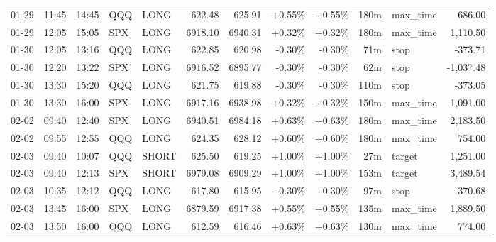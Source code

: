 \documentclass[11pt,a4paper,twoside]{article}
\begin{document}
\begin{center}
\begin{longtable}{>{\color{txtmain}}l l l l l r r r r r >{\color{txtmain}}l r}
01-29 & 11:45 & 14:45 & QQQ & LONG & 622.48 & 625.91 & \textcolor{wingreen}{+0.55\%} & \textcolor{wingreen}{+0.55\%} & 180m & max\_time & \textcolor{wingreen}{686.00} \\
01-29 & 12:05 & 15:05 & SPX & LONG & 6918.10 & 6940.31 & \textcolor{wingreen}{+0.32\%} & \textcolor{wingreen}{+0.32\%} & 180m & max\_time & \textcolor{wingreen}{1,110.50} \\
01-30 & 12:05 & 13:16 & QQQ & LONG & 622.85 & 620.98 & \textcolor{lossred}{-0.30\%} & \textcolor{lossred}{-0.30\%} & 71m & stop & \textcolor{lossred}{-373.71} \\
01-30 & 12:20 & 13:22 & SPX & LONG & 6916.52 & 6895.77 & \textcolor{lossred}{-0.30\%} & \textcolor{lossred}{-0.30\%} & 62m & stop & \textcolor{lossred}{-1,037.48} \\
01-30 & 13:30 & 15:20 & QQQ & LONG & 621.75 & 619.88 & \textcolor{lossred}{-0.30\%} & \textcolor{lossred}{-0.30\%} & 110m & stop & \textcolor{lossred}{-373.05} \\
01-30 & 13:30 & 16:00 & SPX & LONG & 6917.16 & 6938.98 & \textcolor{wingreen}{+0.32\%} & \textcolor{wingreen}{+0.32\%} & 150m & max\_time & \textcolor{wingreen}{1,091.00} \\
02-02 & 09:40 & 12:40 & SPX & LONG & 6940.51 & 6984.18 & \textcolor{wingreen}{+0.63\%} & \textcolor{wingreen}{+0.63\%} & 180m & max\_time & \textcolor{wingreen}{2,183.50} \\
02-02 & 09:55 & 12:55 & QQQ & LONG & 624.35 & 628.12 & \textcolor{wingreen}{+0.60\%} & \textcolor{wingreen}{+0.60\%} & 180m & max\_time & \textcolor{wingreen}{754.00} \\
02-03 & 09:40 & 10:07 & QQQ & SHORT & 625.50 & 619.25 & \textcolor{wingreen}{+1.00\%} & \textcolor{wingreen}{+1.00\%} & 27m & target & \textcolor{wingreen}{1,251.00} \\
02-03 & 09:40 & 12:13 & SPX & SHORT & 6979.08 & 6909.29 & \textcolor{wingreen}{+1.00\%} & \textcolor{wingreen}{+1.00\%} & 153m & target & \textcolor{wingreen}{3,489.54} \\
02-03 & 10:35 & 12:12 & QQQ & LONG & 617.80 & 615.95 & \textcolor{lossred}{-0.30\%} & \textcolor{lossred}{-0.30\%} & 97m & stop & \textcolor{lossred}{-370.68} \\
02-03 & 13:45 & 16:00 & SPX & LONG & 6879.59 & 6917.38 & \textcolor{wingreen}{+0.55\%} & \textcolor{wingreen}{+0.55\%} & 135m & max\_time & \textcolor{wingreen}{1,889.50} \\
02-03 & 13:50 & 16:00 & QQQ & LONG & 612.59 & 616.46 & \textcolor{wingreen}{+0.63\%} & \textcolor{wingreen}{+0.63\%} & 130m & max\_time & \textcolor{wingreen}{774.00} \\

\end{longtable}
\end{center}
\end{document}
